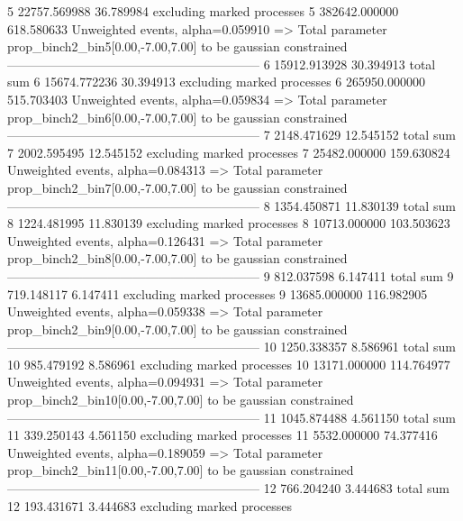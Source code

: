 5          22757.569988    36.789984       excluding marked processes    
5          382642.000000   618.580633      Unweighted events, alpha=0.059910
  => Total parameter prop_binch2_bin5[0.00,-7.00,7.00] to be gaussian constrained
------------------------------------------------------------
6          15912.913928    30.394913       total sum                     
6          15674.772236    30.394913       excluding marked processes    
6          265950.000000   515.703403      Unweighted events, alpha=0.059834
  => Total parameter prop_binch2_bin6[0.00,-7.00,7.00] to be gaussian constrained
------------------------------------------------------------
7          2148.471629     12.545152       total sum                     
7          2002.595495     12.545152       excluding marked processes    
7          25482.000000    159.630824      Unweighted events, alpha=0.084313
  => Total parameter prop_binch2_bin7[0.00,-7.00,7.00] to be gaussian constrained
------------------------------------------------------------
8          1354.450871     11.830139       total sum                     
8          1224.481995     11.830139       excluding marked processes    
8          10713.000000    103.503623      Unweighted events, alpha=0.126431
  => Total parameter prop_binch2_bin8[0.00,-7.00,7.00] to be gaussian constrained
------------------------------------------------------------
9          812.037598      6.147411        total sum                     
9          719.148117      6.147411        excluding marked processes    
9          13685.000000    116.982905      Unweighted events, alpha=0.059338
  => Total parameter prop_binch2_bin9[0.00,-7.00,7.00] to be gaussian constrained
------------------------------------------------------------
10         1250.338357     8.586961        total sum                     
10         985.479192      8.586961        excluding marked processes    
10         13171.000000    114.764977      Unweighted events, alpha=0.094931
  => Total parameter prop_binch2_bin10[0.00,-7.00,7.00] to be gaussian constrained
------------------------------------------------------------
11         1045.874488     4.561150        total sum                     
11         339.250143      4.561150        excluding marked processes    
11         5532.000000     74.377416       Unweighted events, alpha=0.189059
  => Total parameter prop_binch2_bin11[0.00,-7.00,7.00] to be gaussian constrained
------------------------------------------------------------
12         766.204240      3.444683        total sum                     
12         193.431671      3.444683        excluding marked processes    
